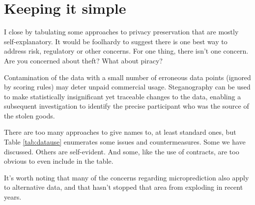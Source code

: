 \section{Keeping it simple}

I close by tabulating some approaches to privacy preservation that are mostly self-explanatory. It would be foolhardy to suggest there is one best way to address risk, regulatory or other concerns. For one thing, there isn't one concern. Are you concerned about theft? What about piracy? 

Contamination of the data with a small number of erroneous data points (ignored by scoring rules) may deter unpaid commercial usage. Steganography can be used to make statistically insignificant yet traceable changes to the data, enabling a subsequent investigation to identify the precise participant who was the source of the stolen goods. 

There are too many approaches to give names to, at least standard ones, but Table \ref{tab:datause} enumerates some issues and countermeasures. Some we have discussed. Others are self-evident. And some, like the use of contracts, are too obvious to even include in the table. 

It's worth noting that many of the concerns regarding microprediction also apply to alternative data, and that hasn't stopped that area from exploding in recent years.  

